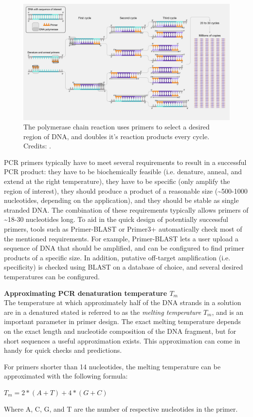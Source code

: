 \begin{framed}
\begin{figure}[!htbp]
\centering
\includegraphics[width=1\linewidth]{files/PCR-2730412a7c2a4e280ab9bfd52d21dbf7.jpg}
\caption[]{The polymerase chain reaction uses primers to select a desired region of DNA, and doubles it's reaction products every cycle.
Credits: \cite{PCR_NHGR}.}
\label{PCR}
\end{figure}
\end{framed}

PCR primers typically have to meet several requirements to result in a successful PCR product: they have to be biochemically feasible (i.e. denature, anneal, and extend at the right temperature), they have to be specific (only amplify the region of interest), they should produce a product of a reasonable size ({\textasciitilde}500-1000 nucleotides, depending on the application), and they should be stable as single stranded DNA. The combination of these requirements typically allows primers of {\textasciitilde}18-30 nucleotides long. To aid in the quick design of potentially successful primers, tools such as Primer-BLAST or Primer3+ automatically check most of the mentioned requirements. For example, Primer-BLAST lets a user upload a sequence of DNA that should be amplified, and can be configured to find primer products of a specific size. In addition, putative off-target amplification (i.e. specificity) is checked using BLAST on a database of choice, and several desired temperatures can be configured.

\begin{framed}
\textbf{Approximating PCR denaturation temperature $T_m$}\\
The temperature at which approximately half of the DNA strands in a solution are in a denatured stated is referred to as the \textit{melting temperature} $T_m$, and is an important parameter in primer design. The exact melting temperature depends on the exact length and nucleotide composition of the DNA fragment, but for short sequences a useful approximation exists. This approximation can come in handy for quick checks and predictions.

For primers shorter than 14 nucleotides, the melting temperature can be approximated with the following formula:

$T_m = 2 * (A + T) + 4 * (G + C)$

Where A, C, G, and T are the number of respective nucleotides in the primer.
\end{framed}



